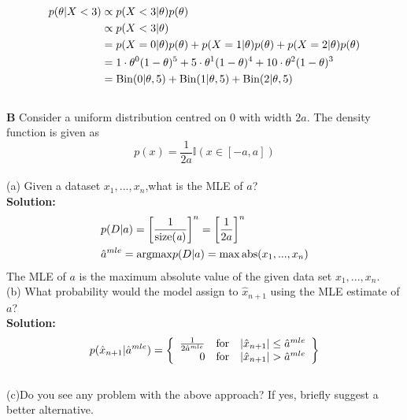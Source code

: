 \documentclass{article}
\begin{document}
\begin{equation}
\begin{aligned}
p(\theta|X<3) & \propto p(X<3|\theta)p(\theta) \\
& \propto p(X<3|\theta)\\
& = p(X=0|\theta)p(\theta) + p(X=1|\theta)p(\theta) + p(X=2|\theta)p(\theta) \\
& = 1\cdot \theta^{0}(1-\theta)^{5}+ 5 \cdot \theta^{1}(1-\theta)^{4} + 10 \cdot \theta^{2}(1-\theta)^{3} \\
& = \rm Bin(0|\theta,5)+Bin(1|\theta,5)+Bin(2|\theta,5)
\end{aligned}
\end{equation}
\\
\textbf{B} Consider a uniform distribution centred on 0 with width $2a$. The density function is given as 
\begin{equation}
    p(x) = \frac{1}{2a} \mathbb{I}(x \in [-a,a])
\end{equation}
\\
(a) Given a dataset $x_1,...,x_n$,what is the MLE of $a$? \\
\textbf{Solution:} \\
\begin{equation}
\begin{aligned}
& p(D|a) = \left[\frac{1}{\rm size(\textit{a})}\right]^{n} = \left[\frac{1}{ 2a}\right]^{n}  \\
& \hat{a}^{mle} = {\rm argmax} p(D|a) = \max {\rm abs}(x_1,...,x_n)
\end{aligned}
\end{equation}
The MLE of $a$ is the maximum absolute value of the given data set $x_1,...,x_n$.
\\
(b) What probability would the model assign to $\hat{x}_{n+1}$ using the MLE estimate of $a$?\\
\textbf{Solution:} \\
\begin{equation}
    p(\hat{x}_{n+1}|\hat{a}^{mle}) = \left\{ \begin{array}{rcl}
         \frac{1}{2\hat{a}^{mle}} & \mbox{for}
         & \abs{\hat{x}_{n+1}} \leq \hat{a}^{mle} \\ 
         0  & \mbox{for} & \abs{\hat{x}_{n+1}} > \hat{a}^{mle} 
         \end{array} \right\}
\end{equation}
\\
(c)Do you see any problem with the above approach? If yes, briefly suggest a better alternative. \\
\end{document}
